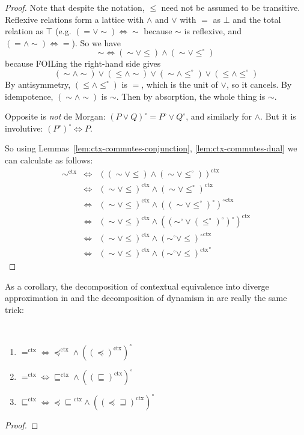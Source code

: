 \documentclass[acmsmall,screen,12pt]{acmart}
\newcommand{\ltdyn}{\sqsubseteq}
\newcommand{\gtdyn}{\sqsupseteq}
\newcommand{\ctxize}[1]{\mathrel{{#1}^{\text{ctx}}}}
\newcommand\errordivergeleft[0]{\preceq\ltdyn}
\newcommand\errordivergerightop[0]{\preceq\gtdyn}
\begin{document}
{\begin{longonly}
\begin{proof}
Note that despite the notation, $\leqslant$ need not be assumed to be
transitive.  
Reflexive relations form a lattice with $\wedge$ and $\vee$ with $=$ as
$\bot$ and the total relation as $\top$ (e.g. $(= \vee \sim)
\Leftrightarrow \sim$ because $\sim$ is reflexive, and $(= \wedge \sim)
\Leftrightarrow =$).  So we have
\[
\sim \Leftrightarrow (\sim \vee \leqslant) \wedge (\sim \vee \leqslant^\circ)
\]
because FOILing the right-hand side gives
\[
(\sim \wedge \sim) \vee (\leqslant \wedge \sim) \vee (\sim \wedge \leqslant^\circ) \vee (\leqslant \wedge \leqslant^\circ)
\]
By antisymmetry, $(\leqslant \wedge \leqslant^\circ)$ is $=$, which is the
unit of $\vee$, so it cancels.  By idempotence, $(\sim \wedge \sim)$ is $\sim$.
Then by absorption, the whole thing is $\sim$.

Opposite is \emph{not} de Morgan: $(P \vee Q)^\circ = P^\circ \vee
Q^\circ$, and similarly for $\wedge$.  But it is involutive:
$(P^\circ)^\circ \Leftrightarrow P$.  

So using Lemmas~\ref{lem:ctx-commutes-conjunction}, \ref{lem:ctx-commutes-dual} we can calculate as follows:
\[
\begin{array}{rcl}
\ctxize\sim & \Leftrightarrow &\ctxize{((\sim \vee \leqslant) \wedge (\sim \vee \leqslant^\circ))} \\
            & \Leftrightarrow &\ctxize{(\sim \vee \leqslant)} \wedge \ctxize{(\sim \vee \leqslant^\circ)}\\
            & \Leftrightarrow &\ctxize{(\sim \vee \leqslant)} \wedge \ctxize{((\sim \vee \leqslant^\circ)^\circ)^\circ}\\
            & \Leftrightarrow &\ctxize{(\sim \vee \leqslant)} \wedge \ctxize{((\sim^\circ \vee (\leqslant^\circ)^\circ)^\circ)}\\
            & \Leftrightarrow &\ctxize{(\sim \vee \leqslant)} \wedge \ctxize{(\sim^\circ \vee \leqslant)^\circ}\\
            & \Leftrightarrow &\ctxize{(\sim \vee \leqslant)} \wedge \ctxize{(\sim^\circ \vee \leqslant)}^\circ
\end{array}
\]
\end{proof}

As a corollary, the decomposition of contextual equivalence into diverge
approximation in \citet{ahmed06:lr} and the decomposition of dynamism in
\citet{newahmed18} are really the same trick:
\begin{corollary} ~~~ \label{cor:contextual-decomposition}
  \begin{enumerate}
  \item $\ctxize= \mathbin{\Leftrightarrow} \ctxize{\preceq} \wedge
    (\ctxize{(\preceq)})^\circ$
  \item $\ctxize= \mathbin{\Leftrightarrow} \ctxize{\ltdyn} \wedge (\ctxize{(\ltdyn)})^\circ$
  \item $\ctxize\ltdyn \mathbin{\Leftrightarrow} \ctxize{\errordivergeleft} \wedge (\ctxize{(\errordivergerightop)})^\circ$
  \end{enumerate}
\end{corollary}
\begin{proof}


\end{proof}
\end{longonly}}
\end{document}
